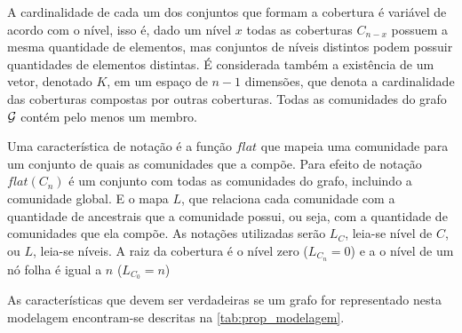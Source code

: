 \documentclass[notes.tex]{subfiles}
\begin{document}
A cardinalidade de cada um dos conjuntos que formam a cobertura é variável de acordo com o nível, isso é, dado um nível $x$ todas as coberturas  $C_{n-x}$ possuem a mesma quantidade de elementos, mas conjuntos de níveis distintos podem possuir quantidades de elementos distintas.
É considerada também a existência de um vetor, denotado $K$, em um espaço de $n-1$ dimensões, que denota a cardinalidade das coberturas compostas por outras coberturas.
Todas as comunidades do grafo $\operatorname{\mathcal{G}}$ contém pelo menos um membro.

Uma característica de notação é a função $flat$ que mapeia uma comunidade para um conjunto de quais as comunidades que a compõe.
Para efeito de notação $flat(C_n)$ é um conjunto com todas as comunidades do grafo, incluindo a comunidade global.
E o mapa $L$, que relaciona cada comunidade com a quantidade de ancestrais que a comunidade possui, ou seja, com a quantidade de comunidades que ela compõe.
As notações utilizadas serão  $L_C$, leia-se nível de $C$, ou $L$, leia-se níveis.
A raiz da cobertura é o nível zero ($L_{C_n} = 0$) e a o nível de um nó folha é igual a $n$ ($L_{C_0}=n$)

As características que devem ser verdadeiras se um grafo for representado nesta modelagem encontram-se descritas na \autoref{tab:prop_modelagem}.
\end{document}
